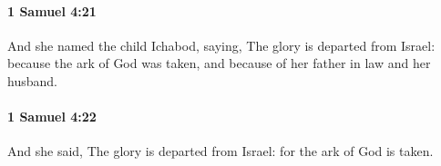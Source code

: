 		\paragraph{1 Samuel 4:21} %
			\label{1SAMUEL-4-21}

			And she named the child Ichabod, saying, The glory is departed from Israel: because the ark of God was taken, and because of her father in law and her husband.


		\paragraph{1 Samuel 4:22} %
			\label{1SAMUEL-4-22}

			And she said, The glory is departed from Israel: for the ark of God is taken.

